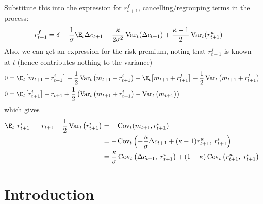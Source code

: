 \documentclass[12pt]{article}
\theoremstyle{plain}
\theoremstyle{definition}
\theoremstyle{remark}
\newcommand{\Cov}{\operatorname{Cov}}
\newcommand{\Var}{\operatorname{Var}}
\begin{document}
Substitute this into the expression for $r_{t+1}^f$,
cancelling/regrouping terms in the process:
\begin{align*}
  r_{t+1}^f &=
  \delta
  +\frac{1}{\sigma}\E_t\Delta c_{t+1}
  -
  \frac{\kappa}{2\sigma^2}
  \Var_t(\Delta c_{t+1})
  +
  \frac{\kappa-1}{2}
  \Var_t(r_{t+1}^w)
\end{align*}
Also, we can get an expression for the risk premium, noting that
$r_{t+1}^f$ is known at $t$ (hence contributes nothing to the variance)
\begin{align*}
  0 &=
  \E_t\big[m_{t+1}+r_{t+1}^i\big]
  +
  \frac{1}{2}\Var_t\big(
  m_{t+1}+r_{t+1}^i\big)
  -
  \E_t\big[m_{t+1}+r_{t+1}^f\big]
  +
  \frac{1}{2}\Var_t\big(
  m_{t+1}+r_{t+1}^f\big)
  \\
  0 &=
  \E_t\big[r_{t+1}^i\big]
  - r_{t+1}
  +
  \frac{1}{2}
  \left(
  \Var_t\big(
  m_{t+1}+r_{t+1}^i\big)
  -
  \Var_t\big( m_{t+1}\big)
  \right)
\end{align*}
which gives
\begin{align*}
  \E_t\big[r_{t+1}^i\big]
  - r_{t+1}
  +\frac{1}{2}
  \Var_t\big(r_{t+1}^i\big)
  &=
  -\Cov_t(m_{t+1},r_{t+1}^i)
  \\
  &=
  -\Cov_t\left(
  -\frac{\kappa}{\sigma}\Delta c_{t+1}
  + (\kappa-1)r_{t+1}^w,\;
  r_{t+1}^i\right)
  \\
  &=
  \frac{\kappa}{\sigma}
  \Cov_t\left(\Delta c_{t+1},\; r_{t+1}^i\right)
  +(1-\kappa)\Cov_t\left( r_{t+1}^w,\; r_{t+1}^i\right)
\end{align*}










\newpage
\section{Introduction}
\end{document}
